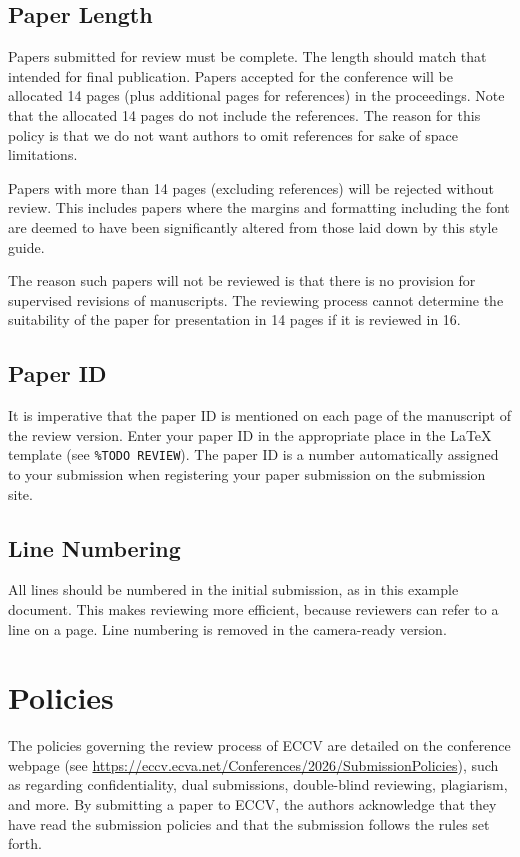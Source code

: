 \documentclass[runningheads]{llncs}
\begin{document}
\subsection{Paper Length}
Papers submitted for review must be complete. 
The length should match that intended for final publication. 
Papers accepted for the conference will be allocated 14 pages (plus additional pages for references) in the proceedings. 
Note that the allocated 14 pages do not include the references. 
The reason for this policy is that we do not want authors to omit references for sake of space limitations.

Papers with more than 14 pages (excluding references) will be rejected without review.
This includes papers where the margins and formatting including the font are deemed to have been significantly altered from those laid down by this style guide.

The reason such papers will not be reviewed is that there is no provision for supervised revisions of manuscripts. 
The reviewing process cannot determine the suitability of the paper for presentation in 14 pages if it is reviewed in 16.


\subsection{Paper ID}
It is imperative that the paper ID is mentioned on each page of the manuscript of the review version.
Enter your paper ID in the appropriate place in the \LaTeX{} template (see \texttt{\%TODO REVIEW}).
The paper ID is a number automatically assigned to your submission when registering your paper submission on the submission site.


\subsection{Line Numbering}
\label{sec:line-numbering}
All lines should be numbered in the initial submission, as in this example document. 
This makes reviewing more efficient, because reviewers can refer to a line on a page. 
Line numbering is removed in the camera-ready version.


\section{Policies}
The policies governing the review process of ECCV \ECCVyear{} are detailed on the conference webpage (see \url{ https://eccv.ecva.net/Conferences/2026/SubmissionPolicies}), such as regarding confidentiality, dual submissions, double-blind reviewing, plagiarism, and more. 
By submitting a paper to ECCV, the authors acknowledge that they have read the submission policies and that the submission follows the rules set forth.
\end{document}
